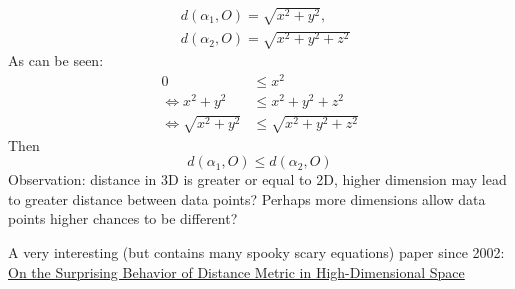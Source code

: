 \begin{equation}
    \begin{split}
        &d(\alpha_1, O) = \sqrt{x^2 + y^2}, \\
        &d(\alpha_2, O) = \sqrt{x^2 + y^2 + z^2}
    \end{split}
\end{equation}
As can be seen:
\begin{equation}
    \begin{split}
        0 &\leq x^2\\
        \iff x^2 + y^2 &\leq x^2 + y^2 + z^2 \\
        \iff \sqrt{x^2 + y^2} &\leq \sqrt{x^2 + y^2 + z^2}
    \end{split}
\end{equation}
Then
\begin{equation}
    d(\alpha_1, O) \leq d(\alpha_2, O)
\end{equation}
Observation: distance in 3D is greater or equal to 2D, higher dimension may lead to greater distance between data points? Perhaps more dimensions allow data points higher chances to be different?

A very interesting (but contains many spooky scary equations) paper since 2002: \href{https://www.researchgate.net/publication/30013021_On_the_Surprising_Behavior_of_Distance_Metric_in_High-Dimensional_Space}{On the Surprising Behavior of Distance Metric in High-Dimensional Space}